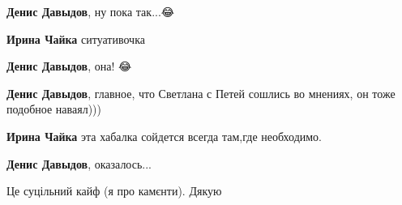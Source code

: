 \begin{itemize}
\begin{itemize}
\textbf{Денис Давыдов}, ну пока так...😂

 
\textbf{Ирина Чайка} ситуативочка

 
\textbf{Денис Давыдов}, она! 😂

 
\textbf{Денис Давыдов}, главное, что Светлана с Петей сошлись во мнениях, он тоже подобное наваял)))

 
\textbf{Ирина Чайка} эта хабалка сойдется всегда там,где необходимо.

 
\textbf{Денис Давыдов}, оказалось...
\end{itemize}

 
Це суцільний кайф (я про камєнти). Дякую 🥃

 


\end{itemize}
